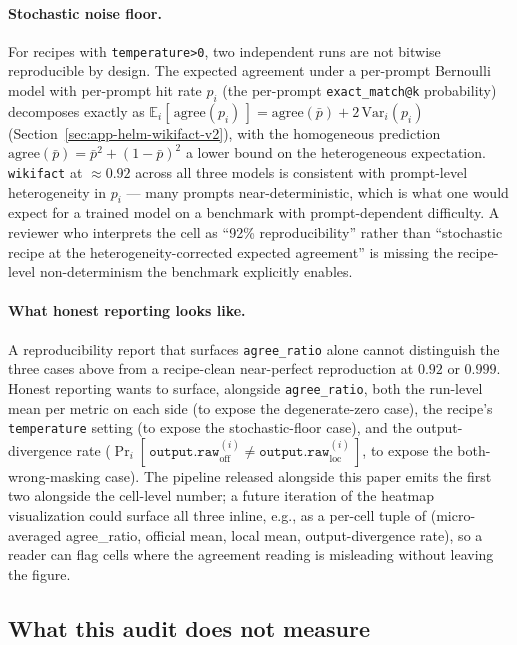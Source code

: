 \paragraph{Stochastic noise floor.}
For recipes with \texttt{temperature>0}, two independent runs are not
  bitwise reproducible by design.
The expected agreement under a per-prompt Bernoulli model with
  per-prompt hit rate $p_i$ (the per-prompt
  \texttt{exact\_match@k} probability) decomposes exactly as
  $\mathbb{E}_i[\,\text{agree}(p_i)\,] = \text{agree}(\bar p) + 2\,
  \mathrm{Var}_i(p_i)$
  (Section~\ref{sec:app-helm-wikifact-v2}), with the homogeneous
  prediction $\text{agree}(\bar p) = \bar p^2 + (1-\bar p)^2$ a lower
  bound on the heterogeneous expectation.
\texttt{wikifact} at $\approx 0.92$ across all three models is
  consistent with prompt-level heterogeneity in $p_i$ — many prompts
  near-deterministic, which is what one would expect for a trained
  model on a benchmark with prompt-dependent difficulty.
A reviewer who interprets the cell as ``92\% reproducibility'' rather
  than ``stochastic recipe at the heterogeneity-corrected expected
  agreement'' is missing the recipe-level non-determinism the
  benchmark explicitly enables.

\paragraph{What honest reporting looks like.}
A reproducibility report that surfaces \texttt{agree\_ratio} alone
  cannot distinguish the three cases above from a recipe-clean
  near-perfect reproduction at $0.92$ or $0.999$.
Honest reporting wants to surface, alongside \texttt{agree\_ratio},
  both the run-level mean per metric on each side (to expose the
  degenerate-zero case), the recipe's \texttt{temperature} setting
  (to expose the stochastic-floor case), and the
  output-divergence rate
  ($\Pr_i[\,\texttt{output.raw}_{\mathrm{off}}^{(i)} \neq
  \texttt{output.raw}_{\mathrm{loc}}^{(i)}\,]$, to expose the
  both-wrong-masking case).
The pipeline released alongside this paper emits the first two
  alongside the cell-level number; a future iteration of the heatmap
  visualization could surface all three inline, e.g., as a per-cell
  tuple of (micro-averaged agree\_ratio, official mean, local mean,
  output-divergence rate), so a reader can flag cells where the
  agreement reading is misleading without leaving the figure.

\subsection{What this audit does not measure}
\label{sec:app-helm-limits-v2}

